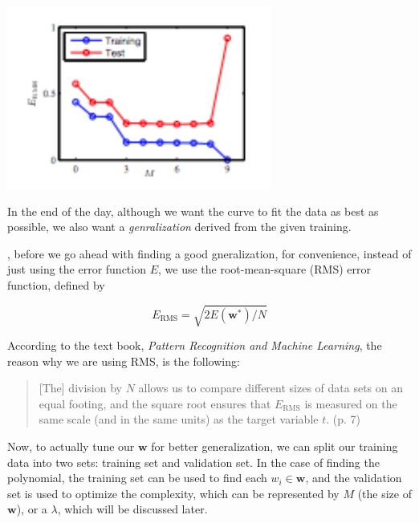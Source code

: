 \documentclass{tufte-handout}
\begin{document}
\begin{marginfigure}
  \includegraphics[width=\linewidth]{overfitting.png}
  \caption{As we can see, the first few polynomials of degree $N < 9$ fit the
    data fine, even when test data is introduced to the training set, but misses
    the mark entirely when $N = 9$. This is the result of overfitting.}
\end{marginfigure}

In the end of the day, although we want the curve to fit the data as best as
possible, we also want a \textit{genralization} derived from the given training.

, before we go ahead with finding a good gneralization,
for convenience, instead of just using the error function $E$, we use the
root-mean-square (RMS) error function, defined by

\begin{equation}
  E_{\text{RMS}} = \sqrt{2E(\mathbf{w}^*)/N}
\end{equation}

According to the text book, \textit{Pattern Recognition and Machine Learning},
the reason why we are using RMS, is the following:

\begin{quote}
  [The] division by $N$ allows us to compare different sizes of data sets
  on an equal footing, and the square root ensures that $E_{\text{RMS}}$ is
  measured on the same scale (and in the same units) as the target variable $t$.
  (p. 7)
\end{quote}

Now, to actually tune our $\mathbf{w}$ for better generalization, we can split
our training data into two sets: training set and validation set. In the case of
finding the polynomial, the training set can be used to find each $w_i \in
\mathbf{w}$, and the validation set is used to optimize the complexity, which
can be represented by $M$ (the size of $\mathbf{w}$), or a $\lambda$, which
will be discussed later.
\end{document}

